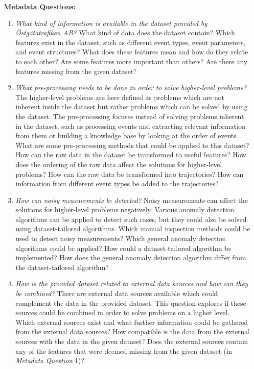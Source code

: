 \begin{description}
  \item \textbf{Metadata Questions:}
  \begin{enumerate}
    \item \textit{What kind of information is available in the dataset provided by Östgötatrafiken AB?} \newline
    What kind of data does the dataset contain?
    Which features exist in the dataset, such as different event types, event parameters, and event structures?
    What does these features mean and how do they relate to each other?
    Are some features more important than others?
    Are there any features missing from the given dataset?
    \item \textit{What pre-processing needs to be done in order to solve higher-level problems?} \newline
    The higher-level problems are here defined as problems which are not inherent inside the dataset but rather problems which can be solved by using the dataset.
    The pre-processing focuses instead of solving problems inherent in the dataset, such as processing events and extracting relevant information from them or building a knowledge base by looking at the order of events.
    What are some pre-processing methods that could be applied to this dataset?
    How can the raw data in the dataset be transformed to useful features?
    How does the ordering of the raw data affect the solutions for higher-level problems?
    How can the raw data be transformed into trajectories?
    How can information from different event types be added to the trajectories?
    \item \textit{How can noisy measurements be detected?} \newline
    Noisy measurements can affect the solutions for higher-level problems negatively.
    Various anomaly detection algorithms can be applied to detect such cases, but they could also be solved using dataset-tailored algorithms.
    Which manual inspection methods could be used to detect noisy measurements?
    Which general anomaly detection algorithms could be applied?
    How could a dataset-tailored algorithm be implemented?
    How does the general anomaly detection algorithm differ from the dataset-tailored algorithm?
    \item \textit{How is the provided dataset related to external data sources and how can they be combined?} \newline
    There are external data sources available which could complement the data in the provided dataset.
    This question explores if these sources could be combined in order to solve problems on a higher level.
    Which external sources exist and what further information could be gathered from the external data sources?
    How compatible is the data from the external sources with the data in the given dataset?
    Does the external sources contain any of the features that were deemed missing from the given dataset (in \textit{Metadata Question} 1)? 
  \end{enumerate}


\end{description}
